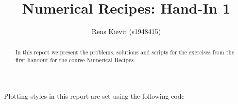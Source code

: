\documentclass[a4paper,10pt]{article}
\title{Numerical Recipes: Hand-In 1}
\author{Rens Kievit (s1948415)}
\begin{document}
\maketitle

\begin{abstract}
    In this report we present the problems, solutions and scripts for the exercises from the first handout for the course Numerical Recipes.
\end{abstract}

Plotting styles in this report are set using the following code





\end{document}
